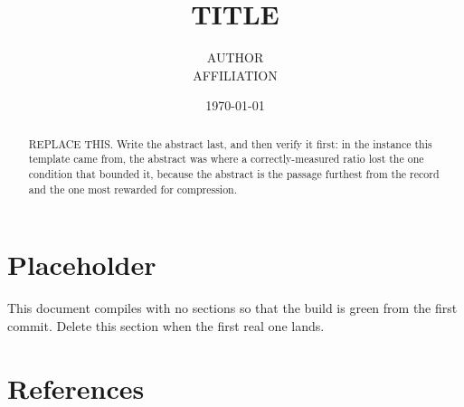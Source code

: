 \documentclass[11pt]{article}
\title{TITLE}
\author{
  AUTHOR \\
  \normalsize AFFILIATION
}
\date{\today}
\begin{document}
\maketitle

\begin{abstract}
REPLACE THIS. Write the abstract last, and then verify it first: in the instance
this template came from, the abstract was where a correctly-measured ratio lost
the one condition that bounded it, because the abstract is the passage furthest
from the record and the one most rewarded for compression.
\end{abstract}

%
% 
% 
% 
% 

\section{Placeholder}
This document compiles with no sections so that the build is green from the
first commit. Delete this section when the first real one lands.

\nocite{example-repository}

\section{References}
\printbibliography[heading=none]

\appendix
% 
\end{document}
